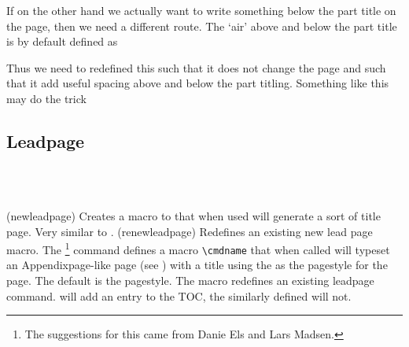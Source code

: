 If on the other hand we actually want to write something below the
part title on the \cmd{\part} page, then we need a different
route. The `air' above and below the part title is by default defined as
\begin{lcode}
  \newcommand*{\beforepartskip}{\null\vfil}
  \newcommand*{\afterpartskip}{\vfil\newpage}
\end{lcode}
Thus we need to redefined this such that it does not change the page
and such that it add useful spacing above and below the part
titling. Something like this may do the trick
\begin{lcode}
\makeatletter
  \newcommand*{\beforepartskip}{\null\vskip4cm}
  \newcommand*{\afterpartskip}{\par\vskip1cm%
    \@afterindentfalse\@afterheading} 
\makeatother
\end{lcode}




\subsection{Leadpage}

\begin{syntax}
\cmd{\newleadpage} \\
\cmd{\renewleadpage} \\
\end{syntax}
\glossary(newleadpage)%
{}%
{Creates a macro to that when used will generate a sort of title
page. Very similar to .}
\glossary(renewleadpage)%
{}%
{Redefines an existing new lead page macro.}
The \cmd{\newleadpage}\footnote{The suggestions for this came from
Danie Els and Lars Madsen.}
command defines a macro \verb?\cmdname? that when called 
will typeset an Appendixpage-like page (see ) with a 
title  using the  as the pagestyle for
the page. The default is the  pagestyle. The macro
\cmd{\renewleadpage} redefines an existing leadpage command. 
\cmd{\cmdname} will add an entry to the TOC, the similarly defined
\cmd{\cmdname*} will not.


